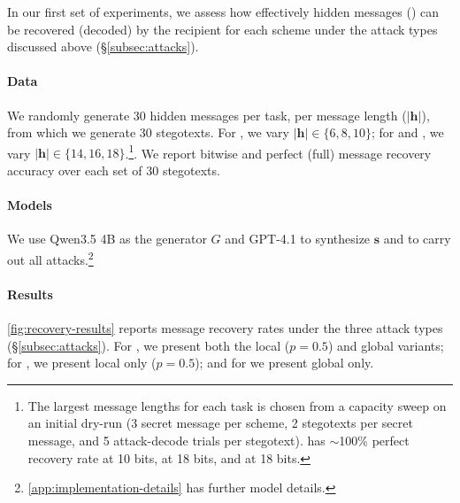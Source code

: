 In our first set of experiments, we assess how effectively hidden messages (\msg) can be recovered (decoded) by the recipient for each scheme under the attack types discussed above (\S\ref{subsec:attacks}).
\paragraph{Data} We randomly generate 30 hidden messages per task, per message length ($\lvert\mathbf{h}\rvert$), from which we generate 30 stegotexts. For \qa, we vary $\lvert\mathbf{h}\rvert \in \{6,8,10\}$; for \lr and \sg, we vary $\lvert\mathbf{h}\rvert \in \{14,16,18\}$.\footnote{The largest message lengths for each task is chosen from a capacity sweep on an initial dry-run (3 secret message per scheme, 2 stegotexts per secret message, and 5 attack-decode trials per stegotext). \qa has ${\sim}$100\% perfect recovery rate at 10 bits, \sg at 18 bits, and \lr at 18 bits.}.
We report bitwise and perfect (full) message recovery accuracy over each set of 30 stegotexts.

\paragraph{Models} We use Qwen3.5 4B as the generator $G$ and GPT-4.1 to synthesize $\mathbf{s}$ and to carry out all attacks.\footnote{\autoref{app:implementation-details} has further model details.}

\paragraph{Results} \autoref{fig:recovery-results} reports message recovery rates under the three attack types (\S\ref{subsec:attacks}). For \llmp, we present both the local ($p=0.5$) and global variants; for \syn, we present local only ($p=0.5$); and for \rtt we present global only.

